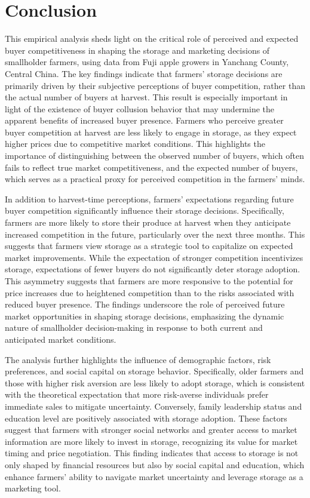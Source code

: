 \section{Conclusion}
\noindent This empirical analysis sheds light on the critical role of perceived and expected buyer competitiveness in shaping the storage and marketing decisions of smallholder farmers, using data from Fuji apple growers in Yanchang County, Central China. The key findings indicate that farmers' storage decisions are primarily driven by their subjective perceptions of buyer competition, rather than the actual number of buyers at harvest. This result is especially important in light of the existence of buyer collusion behavior that may undermine the apparent benefits of increased buyer presence. Farmers who perceive greater buyer competition at harvest are less likely to engage in storage, as they expect higher prices due to competitive market conditions. This highlights the importance of distinguishing between the observed number of buyers, which often fails to reflect true market competitiveness, and the expected number of buyers, which serves as a practical proxy for perceived competition in the farmers’ minds.

In addition to harvest-time perceptions, farmers' expectations regarding future buyer competition significantly influence their storage decisions. Specifically, farmers are more likely to store their produce at harvest when they anticipate increased competition in the future, particularly over the next three months. This suggests that farmers view storage as a strategic tool to capitalize on expected market improvements. While the expectation of stronger competition incentivizes storage, expectations of fewer buyers do not significantly deter storage adoption. This asymmetry suggests that farmers are more responsive to the potential for price increases due to heightened competition than to the risks associated with reduced buyer presence. The findings underscore the role of perceived future market opportunities in shaping storage decisions, emphasizing the dynamic nature of smallholder decision-making in response to both current and anticipated market conditions.

The analysis further highlights the influence of demographic factors, risk preferences, and social capital on storage behavior. Specifically, older farmers and those with higher risk aversion are less likely to adopt storage, which is consistent with the theoretical expectation that more risk-averse individuals prefer immediate sales to mitigate uncertainty. Conversely, family leadership status and education level are positively associated with storage adoption. These factors suggest that farmers with stronger social networks and greater access to market information are more likely to invest in storage, recognizing its value for market timing and price negotiation. This finding indicates that access to storage is not only shaped by financial resources but also by social capital and education, which enhance farmers' ability to navigate market uncertainty and leverage storage as a marketing tool.

